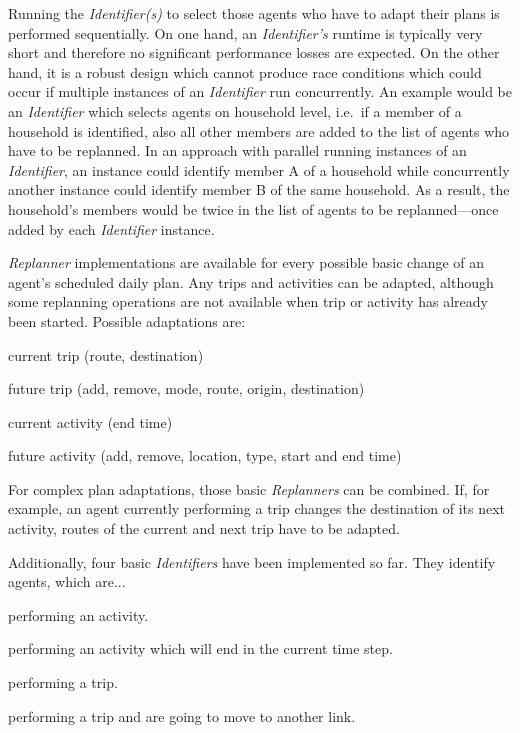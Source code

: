 Running the \emph{Identifier(s)} to select those agents who have to adapt their plans is performed sequentially. On one hand, an \emph{Identifier's} runtime is typically very short and therefore no significant performance losses are expected. On the other hand, it is a robust design which cannot produce race conditions which could occur if multiple instances of an \emph{Identifier} run concurrently. An example would be an \emph{Identifier} which selects agents on household level, i.e.~if a member of a household is identified, also all other members are added to the list of agents who have to be replanned. In an approach with parallel running instances of an \emph{Identifier}, an instance could identify member A of  a household while concurrently another instance could identify member B of the same household. As a result, the household's members would be twice in the list of agents to be replanned---once added by each \emph{Identifier} instance.

\emph{Replanner} implementations are available for every possible basic change of an agent's scheduled daily plan. Any trips and activities can be adapted, although some replanning operations are not available when trip or activity has already been started. Possible adaptations are:
\begin{compactitem}
    \item current trip (route, destination)
    \item future trip (add, remove, mode, route, origin, destination)
    \item current activity (end time)
    \item future activity (add, remove, location, type, start and end time)
\end{compactitem}

For complex plan adaptations, those basic \emph{Replanners} can be combined. If, for example, an agent currently performing a trip changes the destination of its next activity, routes of the current and next trip have to be adapted.

Additionally, four basic \emph{Identifiers} have been implemented so far. They identify agents, which are...
\begin{compactitem}
    \item performing an activity.
    \item performing an activity which will end in the current time step.
    \item performing a trip.
    \item performing a trip and are going to move to another link.
\end{compactitem}

